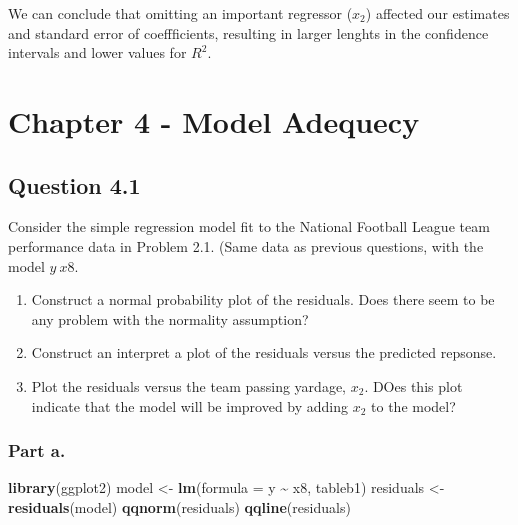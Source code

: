 \documentclass[
  11pt,
]{article}
\newenvironment{Shaded}{\begin{snugshade}}{\end{snugshade}}
\newcommand{\AttributeTok}[1]{\textcolor[rgb]{0.13,0.29,0.53}{#1}}
\newcommand{\FunctionTok}[1]{\textcolor[rgb]{0.13,0.29,0.53}{\textbf{#1}}}
\newcommand{\NormalTok}[1]{#1}
\newcommand{\OtherTok}[1]{\textcolor[rgb]{0.56,0.35,0.01}{#1}}
\newcommand{\SpecialCharTok}[1]{\textcolor[rgb]{0.81,0.36,0.00}{\textbf{#1}}}
\begin{document}
We can conclude that omitting an important regressor (\(x_2\)) affected
our estimates and standard error of coeffficients, resulting in larger
lenghts in the confidence intervals and lower values for \(R^2\).

\section{Chapter 4 - Model Adequecy}\label{chapter-4---model-adequecy}

\subsection{Question 4.1}\label{question-4.1}

Consider the simple regression model fit to the National Football League
team performance data in Problem 2.1. (Same data as previous questions,
with the model \(y ~ x8\).

\begin{enumerate}[label=\alph*.]
  \item Construct a normal probability plot of the residuals. Does there seem to be any problem with the normality assumption? 
  \item Construct an interpret a plot of the residuals versus the predicted repsonse. 
  \item Plot the residuals versus the team passing yardage, $x_2$. DOes this plot indicate that the model will be improved by adding $x_2$ to the model?
\end{enumerate}

\subsubsection{Part a.}\label{part-a.-3}

\begin{Shaded}
\begin{Highlighting}[]
\FunctionTok{library}\NormalTok{(ggplot2)}
\NormalTok{model }\OtherTok{\textless{}{-}} \FunctionTok{lm}\NormalTok{(}\AttributeTok{formula =}\NormalTok{ y }\SpecialCharTok{\textasciitilde{}}\NormalTok{ x8, tableb1)}
\NormalTok{residuals }\OtherTok{\textless{}{-}} \FunctionTok{residuals}\NormalTok{(model)}
\FunctionTok{qqnorm}\NormalTok{(residuals)}
\FunctionTok{qqline}\NormalTok{(residuals)}
\end{Highlighting}
\end{Shaded}
\end{document}
